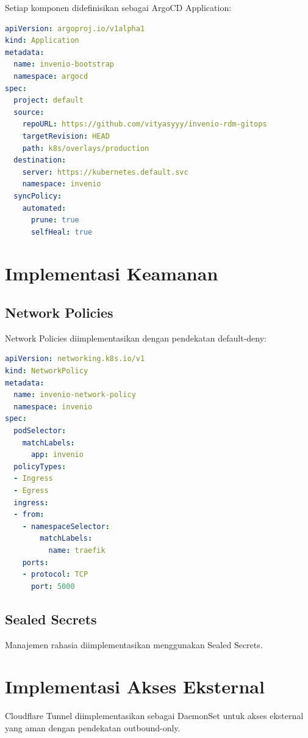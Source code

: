 Setiap komponen didefinisikan sebagai ArgoCD Application:

\begin{lstlisting}[language=yaml, caption={Contoh ArgoCD Application}]
apiVersion: argoproj.io/v1alpha1
kind: Application
metadata:
  name: invenio-bootstrap
  namespace: argocd
spec:
  project: default
  source:
    repoURL: https://github.com/vityasyyy/invenio-rdm-gitops
    targetRevision: HEAD
    path: k8s/overlays/production
  destination:
    server: https://kubernetes.default.svc
    namespace: invenio
  syncPolicy:
    automated:
      prune: true
      selfHeal: true
\end{lstlisting}

\section{Implementasi Keamanan}

\subsection{Network Policies}

Network Policies diimplementasikan dengan pendekatan default-deny:

\begin{lstlisting}[language=yaml, caption={Contoh Network Policy}]
apiVersion: networking.k8s.io/v1
kind: NetworkPolicy
metadata:
  name: invenio-network-policy
  namespace: invenio
spec:
  podSelector:
    matchLabels:
      app: invenio
  policyTypes:
  - Ingress
  - Egress
  ingress:
  - from:
    - namespaceSelector:
        matchLabels:
          name: traefik
    ports:
    - protocol: TCP
      port: 5000
\end{lstlisting}

\subsection{Sealed Secrets}

Manajemen rahasia diimplementasikan menggunakan Sealed Secrets.

\section{Implementasi Akses Eksternal}

Cloudflare Tunnel diimplementasikan sebagai DaemonSet untuk akses eksternal yang aman dengan pendekatan outbound-only.
